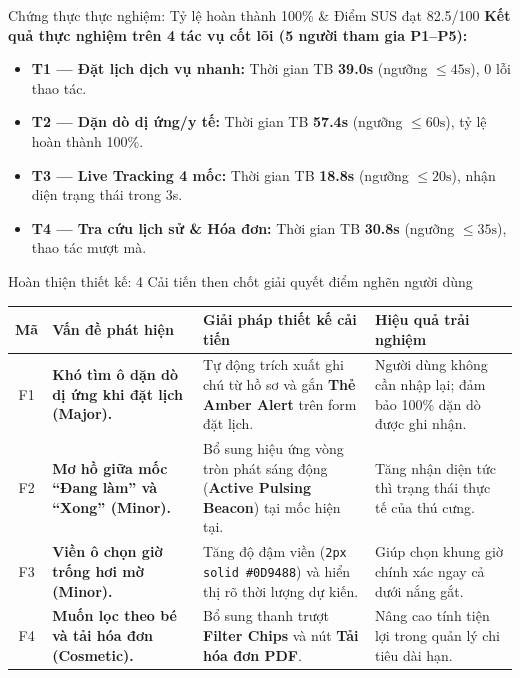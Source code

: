 \begin{frame}{Chứng thực thực nghiệm: Tỷ lệ hoàn thành 100\% \& Điểm SUS đạt 82.5/100}
  \vskip 3mm
  \textbf{Kết quả thực nghiệm trên 4 tác vụ cốt lõi (5 người tham gia P1--P5):}
  \begin{itemize}
    \item \textbf{T1 --- Đặt lịch dịch vụ nhanh:} Thời gian TB \textbf{39.0s} (ngưỡng $\le 45\text{s}$), 0 lỗi thao tác.
    \item \textbf{T2 --- Dặn dò dị ứng/y tế:} Thời gian TB \textbf{57.4s} (ngưỡng $\le 60\text{s}$), tỷ lệ hoàn thành 100\%.
    \item \textbf{T3 --- Live Tracking 4 mốc:} Thời gian TB \textbf{18.8s} (ngưỡng $\le 20\text{s}$), nhận diện trạng thái trong 3s.
    \item \textbf{T4 --- Tra cứu lịch sử \& Hóa đơn:} Thời gian TB \textbf{30.8s} (ngưỡng $\le 35\text{s}$), thao tác mượt mà.
  \end{itemize}
\end{frame}

\begin{frame}{Hoàn thiện thiết kế: 4 Cải tiến then chốt giải quyết điểm nghẽn người dùng}
  \footnotesize
  \begin{table}[H]
    \centering
    \begin{tabularx}{\textwidth}{c>{\bfseries}p{2.6cm}X>{\color{PetcarePrimary}}X}
      \toprule
      \textbf{Mã} & \textbf{Vấn đề phát hiện} & \textbf{Giải pháp thiết kế cải tiến} & \textbf{Hiệu quả trải nghiệm} \\
      \midrule
      F1 & Khó tìm ô dặn dò dị ứng khi đặt lịch (Major). & Tự động trích xuất ghi chú từ hồ sơ và gắn \textbf{Thẻ Amber Alert} trên form đặt lịch. & Người dùng không cần nhập lại; đảm bảo 100\% dặn dò được ghi nhận. \\
      \addlinespace[1mm]
      F2 & Mơ hồ giữa mốc ``Đang làm'' và ``Xong'' (Minor). & Bổ sung hiệu ứng vòng tròn phát sáng động (\textbf{Active Pulsing Beacon}) tại mốc hiện tại. & Tăng nhận diện tức thì trạng thái thực tế của thú cưng. \\
      \addlinespace[1mm]
      F3 & Viền ô chọn giờ trống hơi mờ (Minor). & Tăng độ đậm viền (\texttt{2px solid \#0D9488}) và hiển thị rõ thời lượng dự kiến. & Giúp chọn khung giờ chính xác ngay cả dưới nắng gắt. \\
      \addlinespace[1mm]
      F4 & Muốn lọc theo bé và tải hóa đơn (Cosmetic). & Bổ sung thanh trượt \textbf{Filter Chips} và nút \textbf{Tải hóa đơn PDF}. & Nâng cao tính tiện lợi trong quản lý chi tiêu dài hạn. \\
      \bottomrule
    \end{tabularx}
  \end{table}
\end{frame}

